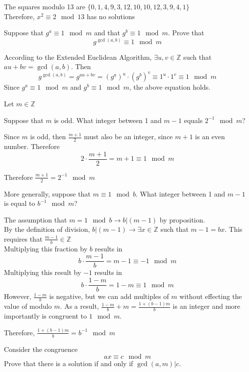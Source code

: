\documentclass[12pt]{article}
\begin{document}
    \solution
    The squares modulo 13 are $\{0,1,4,9,3,12,10,10,12,3,9,4,1\}$\\
    Therefore, $x^2\equiv 2\mod 13$ has no solutions

    \problem Suppose that $g^a\equiv 1\mod m$ and that $g^b\equiv 1\mod m$. Prove that
    \[g^{\gcd(a,b)}\equiv 1\mod m\]

    \solution
    According to the Extended Euclidean Algorithm, $\exists u,v\in\mathbb{Z}$ such that $au+bv=\gcd(a,b)$. Then
    \[g^{\gcd(a,b)}=g^{au+bv}=(g^a)^u\cdot(g^b)^v\equiv1^u\cdot1^v\equiv 1\mod{m}\]
    Since $g^a\equiv1\mod{m}$ and $g^b\equiv1\mod{m}$, the above equation holds.

    \clearpage
    \problem Let $m\in\mathbb{Z}$
    
    \subproblem Suppose that $m$ is odd. What integer between 1 and $m-1$ equals $2^{-1}\mod{m}$?

    \solution
    Since $m$ is odd, then $\frac{m+1}{2}$ must also be an integer, since $m+1$ is an even number. Therefore
    \[2\cdot\frac{m+1}{2}=m+1\equiv1\mod{m}\]

    \noindent
    Therefore $\frac{m+1}{2}=2^{-1}\mod{m}$
    
    \subproblem More generally, suppose that $m\equiv 1\mod b$. What integer between 1 and $m-1$ is equal to $b^{-1}\mod m$?

    \solution
    The assumption that $m=1\mod{b}\rightarrow b|(m-1)$ by proposition.\\
    By the definition of division, $b|(m-1)\rightarrow\exists x\in\mathbb{Z}$ such that $m-1=bx$. This requires that $\frac{m-1}{b}\in\mathbb{Z}$\\
    Multiplying this fraction by $b$ results in
    \[b\cdot\frac{m-1}{b}=m-1\equiv-1\mod{m}\]
    Multiplying this result by $-1$ results in
    \[b\cdot\frac{1-m}{b}=1-m\equiv1\mod{m}\]
    However, $\frac{1-m}{b}$ is negative, but we can add multiples of $m$ without effecting the value of modulo $m$. As a result, $\frac{1-m}{b}+m=\frac{1+(b-1)m}{b}$ is an integer and more importantly is congruent to $1\mod{m}$.

    \noindent
    Therefore, $\frac{1+(b-1)m}{b}=b^{-1}\mod{m}$

    \clearpage
    \problem Consider the congruence
    \[
    ax\equiv c\mod m
    \]
    Prove that there is a solution if and only if $\gcd(a,m)|c$.
\end{document}
